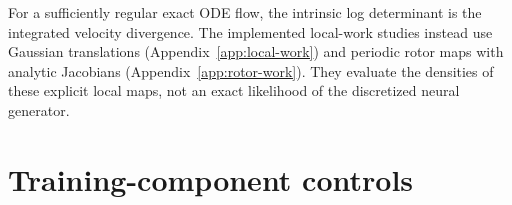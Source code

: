 \documentclass{article}
\begin{document}
For a sufficiently regular exact ODE flow, the intrinsic log determinant is the integrated velocity divergence. The implemented local-work studies instead use Gaussian translations (Appendix~\ref{app:local-work}) and periodic rotor maps with analytic Jacobians (Appendix~\ref{app:rotor-work}). They evaluate the densities of these explicit local maps, not an exact likelihood of the discretized neural generator.





\section{Training-component controls}\label{app:components}




\end{document}
